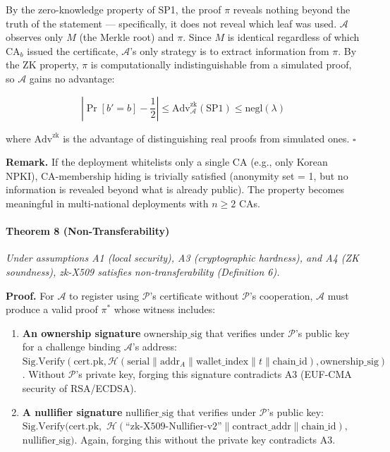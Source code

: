 \documentclass[11pt, a4paper]{article}
\begin{document}
By the zero-knowledge property of SP1, the proof \(\pi\) reveals nothing
beyond the truth of the statement --- specifically, it does not reveal
which leaf was used. \(\mathcal{A}\) observes only \(M\) (the Merkle
root) and \(\pi\). Since \(M\) is identical regardless of which
\(\text{CA}_b\) issued the certificate, \(\mathcal{A}\)'s only strategy
is to extract information from \(\pi\). By the ZK property, \(\pi\) is
computationally indistinguishable from a simulated proof, so
\(\mathcal{A}\) gains no advantage:

\[\left| \Pr[b' = b] - \frac{1}{2} \right| \leq \text{Adv}_{\mathcal{A}}^{\text{zk}}(\text{SP1}) \leq \text{negl}(\lambda)\]

where \(\text{Adv}^{\text{zk}}\) is the advantage of distinguishing real
proofs from simulated ones. \(\square\)

\textbf{Remark.} If the deployment whitelists only a single CA (e.g.,
only Korean NPKI), CA-membership hiding is trivially satisfied (anonymity set =
1, but no information is revealed beyond what is already public). The
property becomes meaningful in multi-national deployments with
\(n \geq 2\) CAs.

\paragraph{Theorem 8
(Non-Transferability)}\label{theorem-8-non-transferability}

\emph{Under assumptions A1 (local security), A3 (cryptographic
hardness), and A4 (ZK soundness), zk-X509 satisfies non-transferability
(Definition 6).}

\textbf{Proof.} For \(\mathcal{A}\) to register using \(\mathcal{P}\)'s
certificate without \(\mathcal{P}\)'s cooperation, \(\mathcal{A}\) must
produce a valid proof \(\pi^*\) whose witness includes:

\begin{enumerate}
\def\labelenumi{(\alph{enumi})}
\item
  \textbf{An ownership signature} \(\text{ownership\_sig}\) that
  verifies under \(\mathcal{P}\)'s public key for a challenge binding
  \(\mathcal{A}\)'s address:
  \(\text{Sig.Verify}(\text{cert.pk}, \mathcal{H}(\text{serial} \| \text{addr}_A \| \text{wallet\_index} \| t \| \text{chain\_id}), \text{ownership\_sig})\).
  Without \(\mathcal{P}\)'s private key, forging this signature
  contradicts A3 (EUF-CMA security of RSA/ECDSA).
\item
  \textbf{A nullifier signature} \(\text{nullifier\_sig}\) that verifies
  under \(\mathcal{P}\)'s public key:
  \(\text{Sig.Verify}(\text{cert.pk},\)
  \(\mathcal{H}(\text{``zk-X509-Nullifier-v2''} \| \text{contract\_addr} \| \text{chain\_id}),\)
  \(\text{nullifier\_sig})\).
  Again, forging this without the private key contradicts A3.
\end{enumerate}
\end{document}
